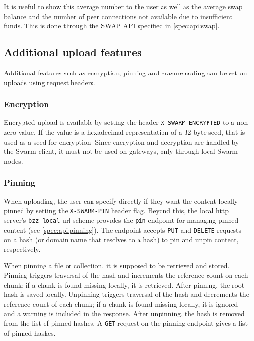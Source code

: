 It is useful to show this average number to the user as well as the average swap balance and the number of peer connections not available due to insufficient funds. This is done through the SWAP API specified in \ref{spec:api:swap}.

\subsection{Additional upload features}\label{sec:features}

Additional features such as encryption, pinning and erasure coding can be set on uploads using request headers. 


\subsubsection{Encryption}

Encrypted upload is available by setting the header \texttt{X-SWARM-ENCRYPTED} to a non-zero value. If the value is a hexadecimal representation of a 32 byte seed, that is used as a seed for encryption. Since encryption and decryption are handled by the Swarm client, it must not be used on gateways, only through local Swarm nodes.

\subsubsection{Pinning}

When uploading, the user can specify directly if they want the content locally pinned by setting the \texttt{X-SWARM-PIN} header flag. Beyond this, the local http server's \texttt{bzz-local} url scheme provides the \texttt{pin} endpoint for managing pinned content (see \ref{spec:api:pinning}). The endpoint accepts \texttt{PUT} and \texttt{DELETE} requests on a hash (or domain name that resolves to a hash) to pin and unpin content, respectively.

When pinning a file or collection, it is supposed to be retrieved and stored. Pinning triggers traversal of the hash and increments the reference count on each chunk; if a chunk is found missing locally, it is retrieved. After pinning,  the root hash is saved locally. Unpinning triggers traversal of the hash and decrements the reference count of each chunk; if a chunk is found missing locally, it is ignored and a warning is included in the response. After unpinning, the hash is removed from the list of pinned hashes. A \texttt{GET} request on the pinning endpoint gives a list of pinned hashes.  

